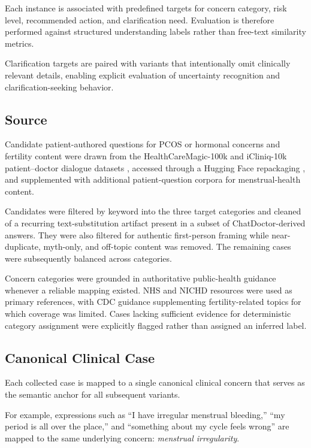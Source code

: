 Each instance is associated with predefined targets for concern category,
risk level, recommended action, and clarification need. Evaluation is
therefore performed against structured understanding labels rather than
free-text similarity metrics.

Clarification targets are paired with variants that intentionally omit
clinically relevant details, enabling explicit evaluation of uncertainty
recognition and clarification-seeking behavior.


\subsection{Source}

Candidate patient-authored questions for PCOS or hormonal concerns and
fertility content were drawn from the HealthCareMagic-100k and iCliniq-10k
patient--doctor dialogue datasets
\citep{li-etal-2023-chatdoctor,li-2023-chatdoctor-repo},
accessed through a Hugging Face repackaging
\citep{malikeh1375-2023-medical}, and supplemented with additional
patient-question corpora for menstrual-health content.

Candidates were filtered by keyword into the three target categories and
cleaned of a recurring text-substitution artifact present in a subset of
ChatDoctor-derived answers. They were also filtered for authentic
first-person framing while near-duplicate, myth-only, and off-topic content
was removed. The remaining cases were subsequently balanced across
categories.

Concern categories were grounded in authoritative public-health guidance
whenever a reliable mapping existed. NHS and NICHD resources were used as
primary references, with CDC guidance supplementing fertility-related topics
for which coverage was limited. Cases lacking sufficient evidence for
deterministic category assignment were explicitly flagged rather than
assigned an inferred label.


\subsection{Canonical Clinical Case}

Each collected case is mapped to a single canonical clinical concern that
serves as the semantic anchor for all subsequent variants.

For example, expressions such as
``I have irregular menstrual bleeding,''
``my period is all over the place,'' and
``something about my cycle feels wrong''
are mapped to the same underlying concern:
\emph{menstrual irregularity}.

